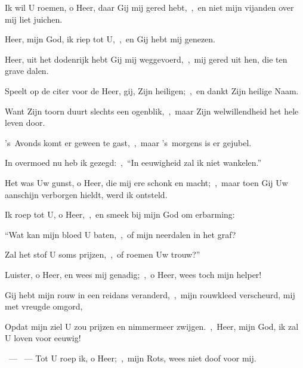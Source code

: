 \documentclass[12pt,twoside,a5paper]{article}
\begin{document}
\begin{halfparskip}
   Ik wil U roemen, o Heer, daar Gij mij gered hebt,~\sep\ en niet mijn vijanden over mij liet juichen.

  Heer, mijn God, ik riep tot U,~\sep\ en Gij hebt mij genezen.

  Heer, uit het dodenrijk hebt Gij mij weggevoerd,~\sep\ mij gered uit hen, die ten grave dalen.

  Speelt op de citer voor de Heer, gij, Zijn heiligen;~\sep\ en dankt Zijn heilige Naam.

  Want Zijn toorn duurt slechts een ogenblik,~\sep\ maar Zijn welwillendheid het hele leven door.

  's~Avonds komt er geween te gast,~\sep\ maar 's~morgens is er gejubel.

  In overmoed nu heb ik gezegd:~\sep\ ``In eeuwigheid zal ik niet wankelen.''

  Het was Uw gunst, o Heer, die mij ere schonk en macht;~\sep\ maar toen Gij Uw aanschijn verborgen hieldt, werd ik ontsteld.

  Ik roep tot U, o Heer,~\sep\ en smeek bij mijn God om erbarming:

  ``Wat kan mijn bloed U baten,~\sep\ of mijn neerdalen in het graf?

  Zal het stof U soms prijzen,~\sep\ of roemen Uw trouw?''

  Luister, o Heer, en wees mij genadig;~\sep\ o Heer, wees toch mijn helper!

  Gij hebt mijn rouw in een reidans veranderd,~\sep\ mijn rouwkleed verscheurd, mij met vreugde omgord,

  Opdat mijn ziel U zou prijzen en nimmermeer zwijgen.~\sep\ Heer, mijn God, ik zal U loven voor eeuwig!
\end{halfparskip}

\begin{halfparskip}
  ~--- ~---  Tot U roep ik, o Heer;~\sep\ mijn Rots, wees niet doof voor mij.
\end{halfparskip}

\end{document}
